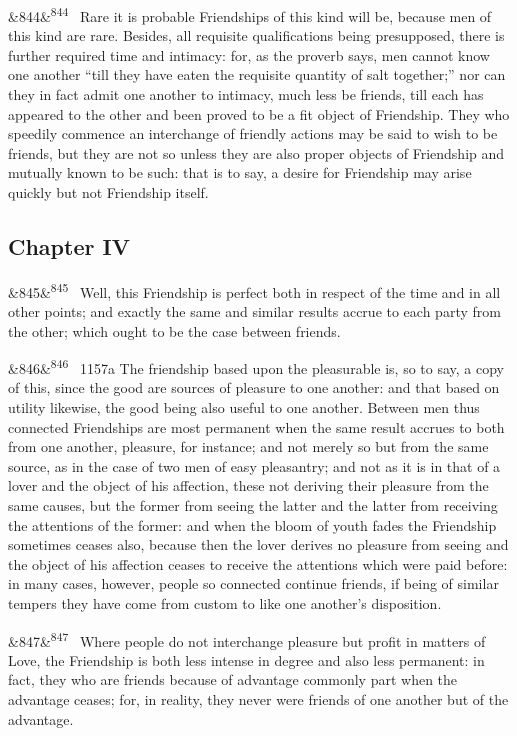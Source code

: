 \documentclass[12pt]{article}
\newcommand{\para}[1][]{\par\noindent\ifx&#1&\else\textsuperscript{\footnotesize #1}~\fi}
\begin{document}
\para[844] Rare it is probable Friendships of this kind will be, because men of this kind are rare. Besides, all requisite qualifications being presupposed, there is further required time and intimacy: for, as the proverb says, men cannot know one another “till they have eaten the requisite quantity of salt together;” nor can they in fact admit one another to intimacy, much less be friends, till each has appeared to the other and been proved to be a fit object of Friendship. They who speedily commence an interchange of friendly actions may be said to wish to be friends, but they are not so unless they are also proper objects of Friendship and mutually known to be such: that is to say, a desire for Friendship may arise quickly but not Friendship itself.

\subsection*{Chapter IV}

\para[845] Well, this Friendship is perfect both in respect of the time and in all other points; and exactly the same and similar results accrue to each party from the other; which ought to be the case between friends.

\para[846] 1157a The friendship based upon the pleasurable is, so to say, a copy of this, since the good are sources of pleasure to one another: and that based on utility likewise, the good being also useful to one another. Between men thus connected Friendships are most permanent when the same result accrues to both from one another, pleasure, for instance; and not merely so but from the same source, as in the case of two men of easy pleasantry; and not as it is in that of a lover and the object of his affection, these not deriving their pleasure from the same causes, but the former from seeing the latter and the latter from receiving the attentions of the former: and when the bloom of youth fades the Friendship sometimes ceases also, because then the lover derives no pleasure from seeing and the object of his affection ceases to receive the attentions which were paid before: in many cases, however, people so connected continue friends, if being of similar tempers they have come from custom to like one another's disposition.

\para[847] Where people do not interchange pleasure but profit in matters of Love, the Friendship is both less intense in degree and also less permanent: in fact, they who are friends because of advantage commonly part when the advantage ceases; for, in reality, they never were friends of one another but of the advantage.
\end{document}
